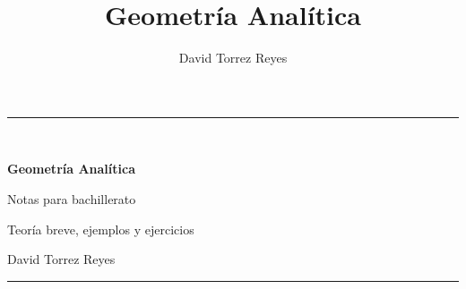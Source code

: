 \documentclass[11pt,letterpaper,oneside]{book}
\title{Geometría Analítica}
\author{David Torrez Reyes}
\date{}
\begin{document}
\frontmatter
\begin{titlepage}
  \centering
  \vspace*{2.3cm}
  {\color{GAazul}\rule{\textwidth}{1.4pt}}\\[1.2cm]
  {\Huge\bfseries Geometría Analítica\par}
  \vspace{.45cm}
  {\Large Notas para bachillerato\par}
  \vspace{1.2cm}
  {\large Teoría breve, ejemplos y ejercicios\par}
  \vfill
  {\large David Torrez Reyes\par}
  \vspace{.6cm}
  {\color{GAazul}\rule{\textwidth}{1.4pt}}
\end{titlepage}

\tableofcontents

\mainmatter







\end{document}
